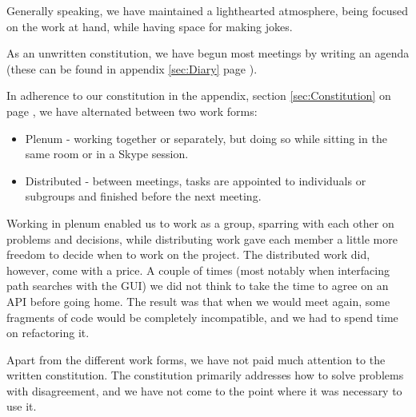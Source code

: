 Generally speaking, we have maintained a lighthearted atmosphere, being focused on the work at hand, while having space for making jokes.

As an unwritten constitution, we have begun most meetings by writing an agenda (these can be found in appendix \ref{sec:Diary} page \pageref{sec:Diary}).

In adherence to our constitution in the appendix, section \ref{sec:Constitution} on page \pageref{sec:Constitution},
we have alternated between two work forms: 
\begin{itemize}
	\item Plenum - working together or separately, but doing so while sitting in the same room or in a Skype session.
	\item Distributed - between meetings, tasks are appointed to individuals or subgroups and finished before the next meeting.
\end{itemize}
Working in plenum enabled us to work as a group, sparring with each other on problems and decisions, while distributing work gave each member a little more freedom to decide when to work on the project.
The distributed work did, however, come with a price. A couple of times (most notably when interfacing path searches with the GUI) we did not think to take the time to agree on an API before going home. The result was that when we would meet again, some fragments of code would be completely incompatible, and we had to spend time on refactoring it.

Apart from the different work forms, we have not paid much attention to the written constitution. The constitution primarily addresses how to solve problems with disagreement, and we have not come to the point where it was necessary to use it.
